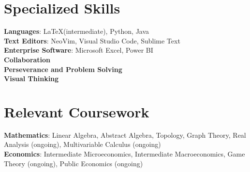 \documentclass[letterpaper,10pt]{article}
\begin{document}
\section{Specialized Skills}
\begin{itemize}[leftmargin=0.15in, label={}]
    \normalsize{\item{
     \textbf{Languages}{: \LaTeX (intermediate), Python, Java} \\
     \textbf{Text Editors}{: NeoVim, Visual Studio Code, Sublime Text}\\
     \textbf{Enterprise Software}{: Microsoft Excel, Power BI}\\
     \textbf{Collaboration}{}\\
     \textbf{Perseverance and Problem Solving}{} \\
     \textbf{Visual Thinking}\\
    }}
 \end{itemize}

 \section{Relevant Coursework}
\begin{itemize}[leftmargin=0.15in, label={}]
    \normalsize{\item{
        \textbf{Mathematics}{: Linear Algebra, Abstract Algebra, Topology, Graph Theory, Real Analysis (ongoing), Multivariable Calculus (ongoing)}\\
        \textbf{Economics}{: Intermediate Microeconomics, Intermediate Macroeconomics, Game Theory (ongoing), Public Economics (ongoing)}\\
    }}    
 \end{itemize}
\end{document}

